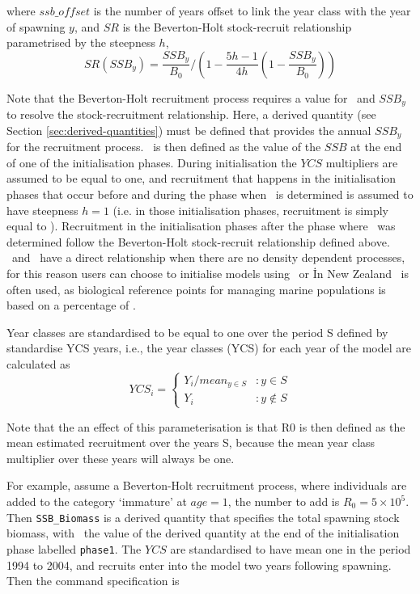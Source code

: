 where $ssb\_offset$ is the number of years offset to link the year class with the year of spawning $y$, and $SR$ is the Beverton-Holt stock-recruit relationship parametrised by the steepness $h$,
\begin{equation}
SR(SSB_y) = \frac{SSB_y}{B_0} / \left( 1-\frac{5h-1}{4h} \left( 1-\frac{SSB_y}{B_0} \right) \right)
\end{equation}

Note that the Beverton-Holt recruitment process requires a value for \Bzero\ and $SSB_y$ to resolve the stock-recruitment relationship. Here, a derived quantity (see Section \ref{sec:derived-quantities}) must be defined that provides the annual $SSB_y$ for the recruitment process. \Bzero\ is then defined as the value of the $SSB$ at the end of one of the initialisation phases. During initialisation the $YCS$ multipliers are assumed to be equal to one, and recruitment that happens in the initialisation phases that occur before and during the phase when \Bzero\ is determined is assumed to have steepness $h=1$ (i.e. in those initialisation phases, recruitment is simply equal to \Rzero). Recruitment in the initialisation phases after the phase where \Bzero\ was determined follow the Beverton-Holt stock-recruit relationship defined above. \Rzero\ and \Bzero\ have a direct relationship when there are no density dependent processes, for this reason users can choose to initialise models using \Bzero\ or \Rzero\. In New Zealand \Bzero\ is often used, as biological reference points for managing marine populations is based on a percentage of \Bzero.

Year classes are standardised to be equal to one over the period S defined by standardise YCS years, i.e., the year classes (YCS) for each year of the model are calculated as
\[
YCS_i = 
\begin{cases}
Y_i / mean_{y \in S} & :y \in S\\
Y_i					 & :y \notin S
\end{cases}
\]

Note that the an effect of this parameterisation is that R0 is then defined as the mean estimated recruitment over the years S, because the mean year class multiplier over these years will always be one.

For example, assume a Beverton-Holt recruitment process, where individuals are added to the category `immature' at $age=1$, the number to add is $R_0=5 \times 10^5$. Then \texttt{SSB\_Biomass} is a derived quantity that specifies the total spawning stock biomass, with \Bzero\ the value of the derived quantity at the end of the initialisation phase labelled \texttt{phase1}. The $YCS$ are standardised to have mean one in the period 1994 to 2004, and recruits enter into the model two years following spawning. Then the command specification is

